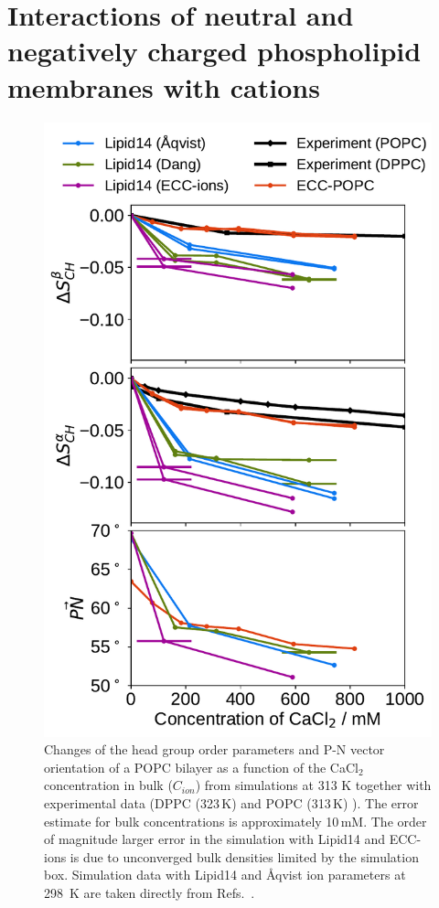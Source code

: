  
 


\section{Interactions of neutral and negatively charged phospholipid membranes with  cations}
\label{section:lip-ion_ca}



\begin{figure}[tbp!] 
  \centering 
  \includegraphics[width=\figwidth]{../img/ecc_popc/OrdPars-A-B-PNvec_L14-ECC-lipids_CaCl.pdf}
  \caption{\label{fig:delta_ordPar_CaCl} 
    Changes of the head group order parameters and P-N vector orientation of a POPC bilayer  
    as a function of the CaCl$_2$ concentration in bulk ($C_{ion}$) 
    from simulations at 313 K together with experimental data  
    (DPPC (323\,K) \citep{akutsu81} and POPC (313\,K) \citep{altenbach84}).  
    The error estimate for bulk concentrations is approximately 10\,mM. 
    The order of magnitude larger error in the
    simulation with Lipid14 and ECC-ions is due to unconverged bulk densities limited by the simulation box.  
    Simulation data with Lipid14 and Åqvist ion parameters at 298~K are taken directly from 
    Refs.~\citep{lipid14POPC0mMNaClfiles,lipid14POPC350mMCaClfiles,lipid14POPC350mMCaClfilesNC}. 
  } 
\end{figure} 


